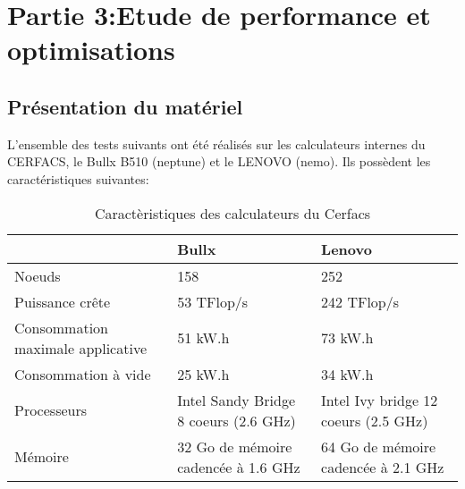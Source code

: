 \section{Partie 3:Etude de performance et optimisations}
\subsection{Présentation du matériel}
L'ensemble des tests suivants ont été réalisés sur les calculateurs internes du CERFACS, le Bullx B510 (neptune) et le LENOVO (nemo). Ils possèdent les caractéristiques suivantes:

\begin{table}[h]
  \begin{center}
    \begin{tabular}{|M{3.5cm}|M{5cm}|M{5cm}|}
      \hline
      & Bullx & Lenovo \\
      \hline
      Noeuds & 158 & 252 \\
      \hline
      Puissance crête & 53 TFlop/s & 242 TFlop/s \\
      \hline
      Consommation maximale applicative & 51 kW.h & 73 kW.h \\
      \hline
      Consommation à vide & 25 kW.h & 34 kW.h \\
      \hline
      Processeurs & Intel Sandy Bridge 8 coeurs (2.6 GHz) & Intel Ivy bridge 12 coeurs (2.5 GHz) \\
      \hline
      Mémoire & 32 Go de mémoire cadencée à 1.6 GHz & 64 Go de mémoire cadencée à 2.1 GHz \\
      \hline
    \end{tabular}
  \end{center}
  \caption{\label{tab:carac}Caractèristiques des calculateurs du Cerfacs}
\end{table}


